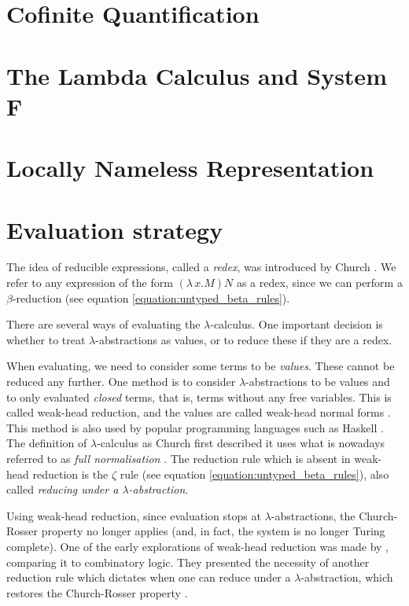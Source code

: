 \documentclass[logo,bsc,singlespacing,parskip,online]{infthesis}
\begin{document}
\section{Cofinite Quantification}



\section{The Lambda Calculus and System F}


\section{Locally Nameless Representation}


\section{Evaluation strategy}
\label{background:evaluation_strategy}
The idea of reducible expressions, called a \textit{redex}, was introduced by Church
\cite[p.~56]{pierce_types_2002}. We refer to any expression of the form $(\lambda \, x. M) N$ as a
redex, since we can perform a $\beta$-reduction (see equation \ref{equation:untyped_beta_rules}).

There are several ways of evaluating the $\lambda$-calculus. One important decision is whether to
treat $\lambda$-abstractions as values, or to reduce these if they are a redex.

When evaluating, we need to consider some terms to be \textit{values}. These cannot be reduced any
further. One method is to consider $\lambda$-abstractions to be values and to only evaluated
\textit{closed} terms, that is, terms without any free variables. This is called weak-head
reduction, and the values are called weak-head normal forms \citep{wadler_programming_2022}. This
method is also used by popular programming languages such as Haskell \citep{hutchison_sharing_2005}.
The definition of $\lambda$-calculus as Church first described it uses what is nowadays referred to
as \textit{full normalisation} \citep{wadler_programming_2022}. The reduction rule which is absent
in weak-head reduction is the $\zeta$ rule (see equation \ref{equation:untyped_beta_rules}), also
called \textit{reducing under a $\lambda$-abstraction}.

Using weak-head reduction, since evaluation stops at $\lambda$-abstractions, the Church-Rosser
property no longer applies (and, in fact, the system is no longer Turing complete). One of the early
explorations of weak-head reduction was made by \citet{cagman_combinatory_1998}, comparing it to
combinatory logic. They presented the necessity of another reduction rule which dictates when one
can reduce under a $\lambda$-abstraction, which restores the Church-Rosser property
\citep{hutchison_sharing_2005}.
\end{document}
